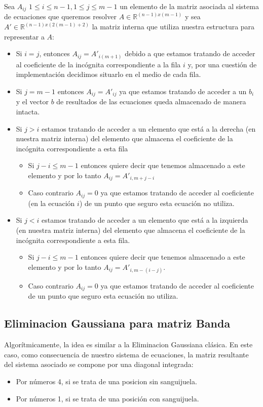 \newline Sea $A_{ij}$ $1 \leq i \leq n - 1, 1 \leq j \leq m - 1$ un elemento de la matriz asociada al sistema de ecuaciones que queremos resolver $A \in \mathbb{R}^{(n - 1)x(m - 1)}$ y sea $A' \in \mathbb{R}^{(n - 1)x(2(m - 1) + 2)}$ la matriz interna que utiliza nuestra estructura para representar a $A$:
\begin{itemize}
\item Si $i = j$, entonces $A_{ij} = A'_{i (m + 1)}$ debido a que estamos tratando de acceder al coeficiente de la incógnita correspondiente a la fila $i$ y, por una cuestión de implementación decidimos situarlo en el medio de cada fila.
\item Si $j = m - 1$ entonces $A_{ij} = A'_{ij}$ ya que estamos tratando de acceder a un $b_i$ y el vector $b$ de resultados de las ecuaciones queda almacenado de manera intacta.
\item Si $j > i$ estamos tratando de acceder a un elemento que está a la derecha (en nuestra matriz interna) del elemento que almacena el coeficiente de la incógnita correspondiente a esta fila
\begin{itemize}
\item Si $j - i \leq m - 1$ entonces quiere decir que tenemos almacenado a este elemento y por lo tanto $A_{ij} = A'_{i, m + j - i}$
\item Caso contrario $A_{ij} = 0$ ya que estamos tratando de acceder al coeficiente (en la ecuación $i$) de un punto que seguro esta ecuación no utiliza.
\end{itemize}
\item Si $j < i$ estamos tratando de acceder a un elemento que está a la izquierda (en nuestra matriz interna) del elemento que almacena el coeficiente de la incógnita correspondiente a esta fila.
\begin{itemize}
\item Si $j - i \leq m - 1$ entonces quiere decir que tenemos almacenado a este elemento y por lo tanto $A_{ij} = A'_{i, m - (i - j)}$.
\item Caso contrario $A_{ij} = 0$ ya que estamos tratando de acceder al coeficiente de un punto que seguro esta ecuación no utiliza.
\end{itemize}
\end{itemize}




\subsection{Eliminacion Gaussiana para matriz Banda}
Algorítmicamente, la idea es similar a la Eliminacion Gaussiana clásica. En este caso, como consecuencia de nuestro sistema de ecuaciones, la matriz resultante del sistema asociado se compone por una diagonal integrada:
\begin{itemize}
\item Por números 4, si se trata de una posicion sin sanguijuela.
\item Por números 1, si se trata de una posición con sanguijuela.
\end{itemize}

